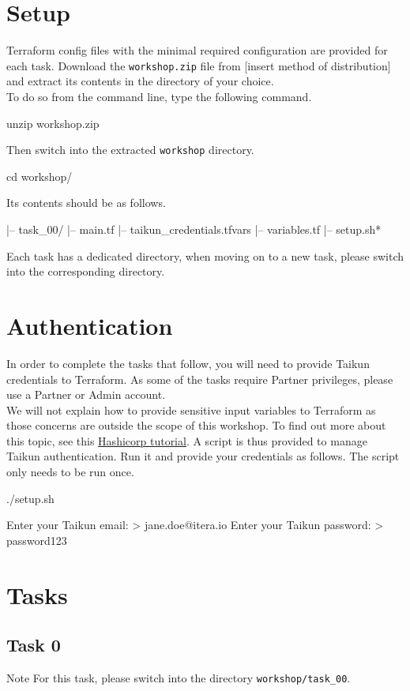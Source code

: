 \section{Setup}
Terraform config files with the minimal required configuration are provided for each task.
Download the \texttt{workshop.zip} file from [insert method of distribution] %
and extract its contents in the directory of your choice.\\

To do so from the command line, type the following command.
\begin{shell}
unzip workshop.zip
\end{shell}

Then switch into the extracted \texttt{workshop} directory.
\begin{shell}
cd workshop/
\end{shell}
Its contents should be as follows.
\begin{raw}
|-- task_00/
    |-- main.tf
    |-- taikun_credentials.tfvars
    |-- variables.tf
|-- setup.sh*
\end{raw}
Each task has a dedicated directory, when moving on to a new task, please switch into the corresponding directory.

\section{Authentication}
In order to complete the tasks that follow, you will need to provide Taikun credentials to Terraform.
As some of the tasks require Partner privileges, please use a Partner or Admin account.\\

We will not explain how to provide sensitive input variables to Terraform as those concerns are outside the scope of this
workshop. %
To find out more about this topic, see this \href{https://learn.hashicorp.com/tutorials/terraform/sensitive-variables}{Hashicorp tutorial}.
A script is thus provided to manage Taikun authentication.
Run it and provide your credentials as follows. The script only needs to be run once.
\begin{shell}
./setup.sh
\end{shell}
\begin{raw}
Enter your Taikun email:
> jane.doe@itera.io
Enter your Taikun password:
> password123
\end{raw}

\section{Tasks}
\subsection{Task 0}

\begin{tip}{Note}
  For this task, please switch into the directory \texttt{workshop/task\_00}.
\end{tip}

\blindtext{}
